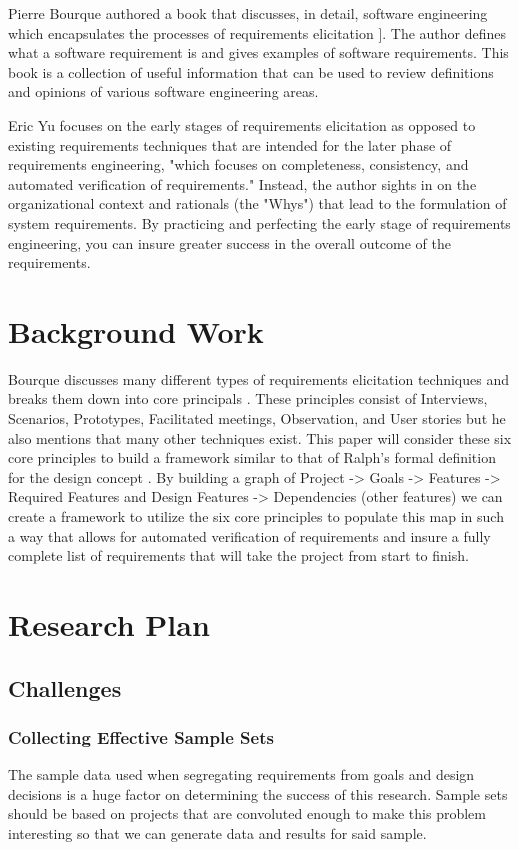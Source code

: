 \documentclass[format=acmlarge]{acmart}
\begin{document}
Pierre Bourque authored a book that discusses, in detail, software engineering which encapsulates the processes of requirements elicitation \cite{Bourque2004}]. The author defines what a software requirement is and gives examples of software requirements. This book is a collection of useful information that can be used to review definitions and opinions of various software engineering areas.

Eric Yu focuses on the early stages of requirements elicitation as opposed to existing requirements techniques that are intended for the later phase of requirements engineering, "which focuses on completeness, consistency, and automated verification of requirements." Instead, the author sights in on the organizational context and rationals (the "Whys") that lead to the formulation of system requirements. By practicing and perfecting the early stage of requirements engineering, you can insure greater success in the overall outcome of the requirements.

\section{Background Work}
Bourque discusses many different types of requirements elicitation techniques and breaks them down into core principals \cite{Bourque2004}. These principles consist of Interviews, Scenarios, Prototypes, Facilitated meetings, Observation, and User stories but he also mentions that many other techniques exist. This paper will consider these six core principles to build a framework similar to that of Ralph's formal definition for the design concept \cite{Ralph2009}. By building a graph of Project -> Goals -> Features -> Required Features and Design Features -> Dependencies (other features) we can create a framework to utilize the six core principles to populate this map in such a way that allows for automated verification of requirements and insure a fully complete list of requirements that will take the project from start to finish.

\section{Research Plan}
\subsection{Challenges}
\subsubsection{Collecting Effective Sample Sets}
The sample data used when segregating requirements from goals and design decisions is a huge factor on determining the success of this research. Sample sets should be based on projects that are convoluted enough to make this problem interesting so that we can generate data and results for said sample. 
\end{document}
